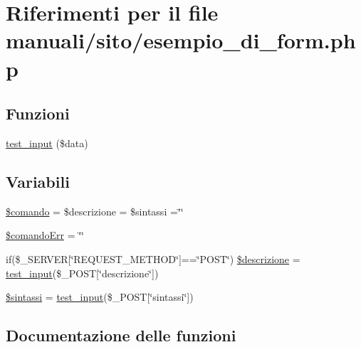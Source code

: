 \hypertarget{esempio__di__form_8php}{}\section{Riferimenti per il file manuali/sito/esempio\+\_\+di\+\_\+form.php}
\label{esempio__di__form_8php}
\subsection*{Funzioni}
\begin{DoxyCompactItemize}
\item 
\mbox{\hyperlink{esempio__di__form_8php_a72bdc8db04ad49397cf3317c27ef9ce7}{test\+\_\+input}} (\$data)
\end{DoxyCompactItemize}
\subsection*{Variabili}
\begin{DoxyCompactItemize}
\item 
\mbox{\hyperlink{esempio__di__form_8php_a58404dbbdcc34692089dc3a4672638c0}{\$comando}} = \$descrizione = \$sintassi =\char`\"{}\char`\"{}
\item 
\mbox{\hyperlink{esempio__di__form_8php_a8975e23f4cdfd28722417fce1e0a4a3f}{\$comando\+Err}} = \char`\"{}\char`\"{}
\item 
if(\$\+\_\+\+S\+E\+R\+V\+ER\mbox{[}\char`\"{}R\+E\+Q\+U\+E\+S\+T\+\_\+\+M\+E\+T\+H\+OD\char`\"{}\mbox{]}==\char`\"{}P\+O\+ST\char`\"{}) \mbox{\hyperlink{esempio__di__form_8php_a41265cd006c32fe23f39288c649d58a6}{\$descrizione}} = \mbox{\hyperlink{esempio__di__form_8php_a72bdc8db04ad49397cf3317c27ef9ce7}{test\+\_\+input}}(\$\+\_\+\+P\+O\+ST\mbox{[}\char`\"{}descrizione\char`\"{}\mbox{]})
\item 
\mbox{\hyperlink{esempio__di__form_8php_a2e3ecf6f11758bbaff5df62ac83222cb}{\$sintassi}} = \mbox{\hyperlink{esempio__di__form_8php_a72bdc8db04ad49397cf3317c27ef9ce7}{test\+\_\+input}}(\$\+\_\+\+P\+O\+ST\mbox{[}\char`\"{}sintassi\char`\"{}\mbox{]})
\end{DoxyCompactItemize}


\subsection{Documentazione delle funzioni}
\mbox{\label{esempio__di__form_8php_a72bdc8db04ad49397cf3317c27ef9ce7}} 
